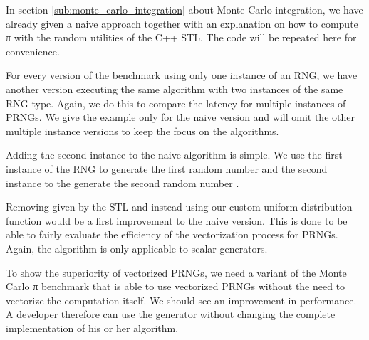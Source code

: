 \documentclass{stdlocal}
\begin{document}
    In section \ref{sub:monte_carlo_integration} about Monte Carlo integration, we have already given a naive approach together with an explanation on how to compute π with the random utilities of the C++ STL.
    The code will be repeated here for convenience.

    For every version of the benchmark using only one instance of an RNG, we have another version executing the same algorithm with two instances of the same RNG type.
    Again, we do this to compare the latency for multiple instances of PRNGs.
    We give the example only for the naive version and will omit the other multiple instance versions to keep the focus on the algorithms.

    Adding the second instance to the naive algorithm is simple.
    We use the first instance of the RNG to generate the first random number  and the  second instance to the generate the second random number .

    Removing  given by the STL and instead using our custom uniform distribution function would be a first improvement to the naive version.
    This is done to be able to fairly evaluate the efficiency of the vectorization process for PRNGs.
    Again, the algorithm is only applicable to scalar generators.

    To show the superiority of vectorized PRNGs, we need a variant of the Monte Carlo π benchmark that is able to use vectorized PRNGs without the need to vectorize the computation itself.
    We should see an improvement in performance.
    A developer therefore can use the generator without changing the complete implementation of his or her algorithm.
\end{document}

